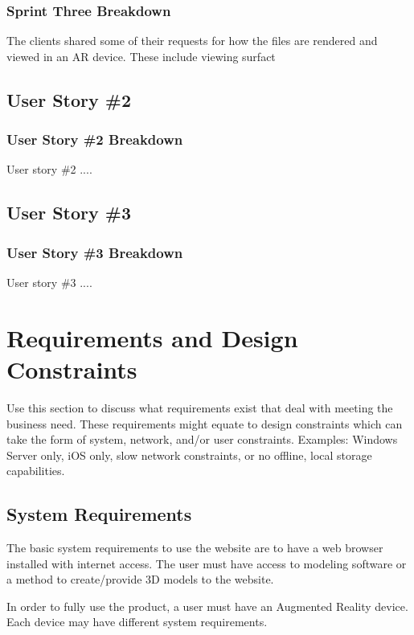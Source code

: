 \subsubsection{Sprint Three Breakdown}

The clients shared some of their requests for how the files are rendered and viewed in an AR device.  These include viewing surfact

\subsection{User Story \#2} 

\subsubsection{User Story \#2 Breakdown}
User story \#2  .... 

\subsection{User Story \#3} 

\subsubsection{User Story \#3 Breakdown}
User story \#3  .... 



\section{Requirements and Design Constraints}
Use this section to discuss what requirements exist that deal with meeting the 
business need.  These requirements might equate to design constraints which can 
take the form of system, network, and/or user constraints.  Examples:  Windows 
Server only, iOS only, slow network constraints, or no offline, local storage capabilities. 


\subsection{System  Requirements}

The basic system requirements to use the website are to have a web browser installed with internet access.  The user must have access to modeling software or a method to create/provide 3D models to the website.

In order to fully use the product, a user must have an Augmented Reality device.  Each device may have different system requirements.

